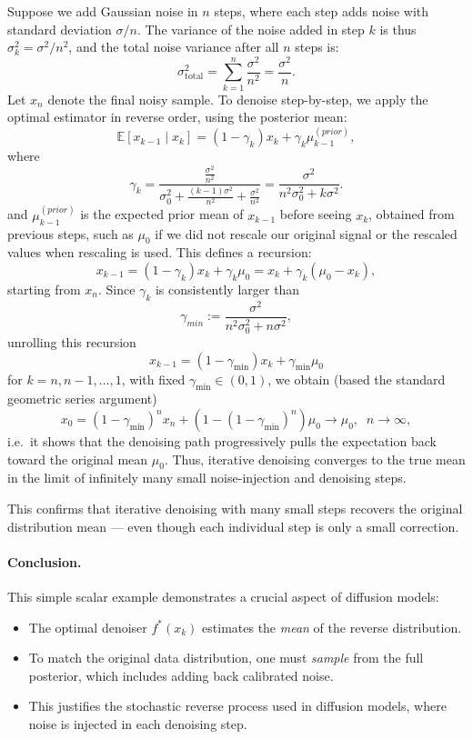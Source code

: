 Suppose we add Gaussian noise in \( n \) steps, where each step adds noise with standard deviation \( \sigma / n \). The variance of the noise added in step \( k \) is thus \( \sigma_k^2 = \sigma^2 / n^2 \), and the total noise variance after all \( n \) steps is:
\[
\sigma_{\text{total}}^2 = \sum_{k=1}^n \frac{\sigma^2}{n^2} = \frac{\sigma^2}{n}.
\]
Let \( x_n \) denote the final noisy sample. To denoise step-by-step, we apply the optimal estimator in reverse order, using the posterior mean:
\[
\mathbb{E}[x_{k-1} \mid x_k] = (1 - \gamma_k) x_k + \gamma_k \mu^{(prior)}_{k-1},
\]
where
\[
\gamma_k
= \frac{\frac{\sigma^2}{n^2}}{\sigma_0^2 + \frac{(k-1)\sigma^2}{n^2} + \frac{\sigma^2}{n^2}}
= \frac{\sigma^2}{{n^2 \sigma_0^2} + k \sigma^2}.
\]
and \( \mu^{(prior)}_{k-1} \) is the expected prior mean of \( x_{k-1} \) before seeing $x_k$, obtained from previous steps, such as $\mu_0$ if we did not rescale our original signal or the rescaled values when rescaling is used. This defines a recursion:
\[
x_{k-1} = (1 - \gamma_k) x_k + \gamma_k \mu_0 = x_k + \gamma_k ( \mu_0 - x_k),
\]
starting from \( x_n \). Since $\gamma_k$ is consistently larger than 
\[
\gamma_{min} := \frac{\sigma^2}{n^2 \sigma_0^2 + n \sigma^2}, 
\] 
unrolling this recursion 
\[
x_{k-1} = (1 - \gamma_{\min}) x_k + \gamma_{\min} \mu_0
\]
for \( k = n, n-1, \dotsc, 1 \), with fixed \( \gamma_{\min} \in (0, 1) \), we obtain (based the standard geometric series argument)
\[
x_0 = (1 - \gamma_{\min})^n x_n + \left(1 - (1 - \gamma_{\min})^n \right) \mu_0
\rightarrow \mu_0, \;\; n \rightarrow \infty, 
\]
i.e.\ it shows that the denoising path progressively pulls the expectation back toward the original mean $\mu_0$. Thus, iterative denoising converges to the true mean in the limit of infinitely many small noise-injection and denoising steps.

This confirms that iterative denoising with many small steps recovers the original distribution mean — even though each individual step is only a small correction.

\paragraph{Conclusion.} This simple scalar example demonstrates a crucial aspect of diffusion models:
\begin{itemize}
    \item The optimal denoiser \( f^*(x_k) \) estimates the \emph{mean} of the reverse distribution.
    \item To match the original data distribution, one must \emph{sample} from the full posterior, which includes adding back calibrated noise.
    \item This justifies the stochastic reverse process used in diffusion models, where noise is injected in each denoising step.
\end{itemize}

